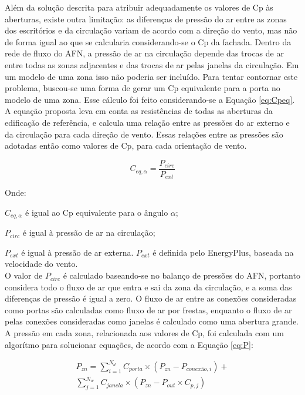 \documentclass[brazil,hardcopy,openany,a5paper]{ufscthesis}
\begin{document}
		Além da solução descrita para atribuir adequadamente os valores de Cp às aberturas, existe outra limitação: as diferenças de pressão do ar entre as zonas dos escritórios e da circulação variam de acordo com a direção do vento, mas não de forma igual ao que se calcularia considerando-se o Cp da fachada.
		Dentro da rede de fluxo do AFN, a pressão de ar na circulação depende das trocas de ar entre todas as zonas adjacentes e das trocas de ar pelas janelas da circulação.
		Em um modelo de uma zona isso não poderia ser incluído. Para tentar contornar este problema, buscou-se uma forma de gerar um Cp equivalente para a porta no modelo de uma zona. Esse cálculo foi feito considerando-se a Equação \ref{eq:Cpeq}. A equação proposta leva em conta as resistências de todas as aberturas da edificação de referência, e calcula uma relação entre as pressões do ar externo e da circulação para cada direção de vento. Essas relações entre as pressões são adotadas então como valores de Cp, para cada orientação de vento.
		
		\begin{equation}\label{eq:Cpeq}
		C_{eq,\alpha} = \frac{P_{circ}}{P_{ext}}
		\end{equation}
		
		Onde:
		
		 $C_{eq,\alpha}$ é igual ao Cp equivalente para o ângulo $\alpha$;
		 
		 $P_{circ}$ é igual à pressão de ar na circulação;
		 
		 $P_{ext}$ é igual à pressão de ar externa. $P_{ext}$ é definida pelo EnergyPlus, baseada na velocidade do vento.
		 \\
		 
		 O valor de $P_{circ}$ é calculado baseando-se no balanço de pressões do AFN, portanto considera todo o fluxo de ar que entra e sai da zona da circulação, e a soma das diferenças de pressão é igual a zero.
		 O fluxo de ar entre as conexões consideradas como portas são calculadas como fluxo de ar por frestas, enquanto o fluxo de ar pelas conexões consideradas como janelas é calculado como uma abertura grande.
		 A pressão em cada zona, relacionada aos valores de Cp, foi calculada com um algorítmo para solucionar equações, de acordo com a Equação \ref{eq:P}:
		 
		 \begin{equation}\label{eq:P}
		 \begin{split}
		 P_{zn} = \sum_{i=1}^{N_d}{C_{porta}\times(P_{zn} - P_{conexão,i})} + \\ %
		 \sum_{j=1}^{N_w}{C_{janela}\times(P_{zn} - P_{out}\times C_{p,j})}
		 \end{split}
		 \end{equation}
		
\end{document}
